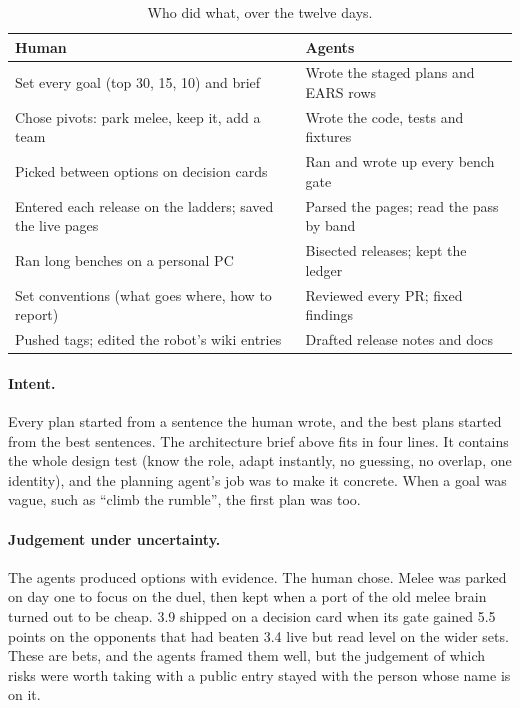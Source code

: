 \documentclass[10pt,twocolumn]{article}
\begin{document}
\begin{table}[t]
\centering
\caption{Who did what, over the twelve days.}
\label{tab:roles}
\small
\begin{tabularx}{\columnwidth}{@{}>{\raggedright\arraybackslash}p{}X@{}}
\toprule
Human & Agents \\
\midrule
Set every goal (top 30, 15, 10) and brief & Wrote the staged plans and EARS rows \\
Chose pivots: park melee, keep it, add a team & Wrote the code, tests and fixtures \\
Picked between options on decision cards & Ran and wrote up every bench gate \\
Entered each release on the ladders; saved the live pages & Parsed the pages; read the pass by band \\
Ran long benches on a personal PC & Bisected releases; kept the ledger \\
Set conventions (what goes where, how to report) & Reviewed every PR; fixed findings \\
Pushed tags; edited the robot's wiki entries & Drafted release notes and docs \\
\bottomrule
\end{tabularx}
\end{table}

\paragraph{Intent.} Every plan started from a sentence the human wrote, and the best plans started
from the best sentences. The architecture brief above fits in four lines. It contains the whole
design test (know the role, adapt instantly, no guessing, no overlap, one identity), and the
planning agent's job was to make it concrete. When a goal was vague, such as ``climb the rumble'',
the first plan was too.

\paragraph{Judgement under uncertainty.} The agents produced options with evidence. The human chose.
Melee was parked on day one to focus on the duel, then kept when a port of the old melee brain
turned out to be cheap. 3.9 shipped on a decision card when its gate gained 5.5 points on the opponents that had beaten
3.4 live but read level on the wider sets. These are bets, and the agents framed them well, but the
judgement of which risks were worth taking with a public entry stayed with the person whose name
is on it.
\end{document}
